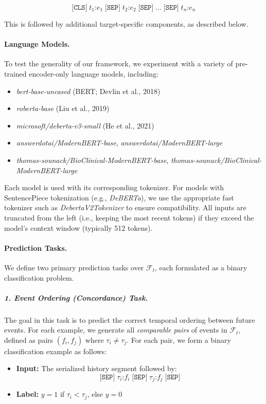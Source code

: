 \begin{equation}
\texttt{[CLS]} \; t_1\texttt{:}e_1 \; \texttt{[SEP]} \; t_2\texttt{:}e_2 \; \texttt{[SEP]} \; \dots \; \texttt{[SEP]} \; t_n\texttt{:}e_n
\end{equation}

This is followed by additional target-specific components, as described below.

\paragraph{Language Models.}
To test the generality of our framework, we experiment with a variety of pre-trained encoder-only language models, including:
\begin{itemize}
    \item \textit{bert-base-uncased} (BERT; Devlin et al., 2018)
    \item \textit{roberta-base} (Liu et al., 2019)
    \item \textit{microsoft/deberta-v3-small} (He et al., 2021)
    \item \textit{answerdotai/ModernBERT-base}, \textit{answerdotai/ModernBERT-large}
    \item \textit{thomas-sounack/BioClinical-ModernBERT-base}, \textit{thomas-sounack/BioClinical-ModernBERT-large} 
\end{itemize}
Each model is used with its corresponding tokenizer. 
For models with SentencePiece tokenization (e.g., \textit{DeBERTa}), we use the appropriate fast tokenizer such as \textit{DebertaV2Tokenizer} to ensure compatibility. 
All inputs are truncated from the left (i.e., keeping the most recent tokens) if they exceed the model's context window (typically 512 tokens).

\paragraph{Prediction Tasks.}
We define two primary prediction tasks over $\mathcal{F}_t$, each formulated as a binary classification problem.

\subparagraph{1. Event Ordering (Concordance) Task.}
The goal in this task is to predict the correct temporal ordering between future events. 
For each example, we generate all \emph{comparable pairs} of events in $\mathcal{F}_t$, defined as pairs $(f_i, f_j)$ where $\tau_i \neq \tau_j$. 
For each pair, we form a binary classification example as follows:

\begin{itemize}
    \item \textbf{Input:} The serialized history segment followed by:
    \begin{equation}
        \texttt{[SEP]} \; \tau_i\texttt{:}f_i \; \texttt{[SEP]} \; \tau_j\texttt{:}f_j \; \texttt{[SEP]}
    \end{equation}
    \item \textbf{Label:} $y = 1$ if $\tau_i < \tau_j$, else $y = 0$
\end{itemize}

